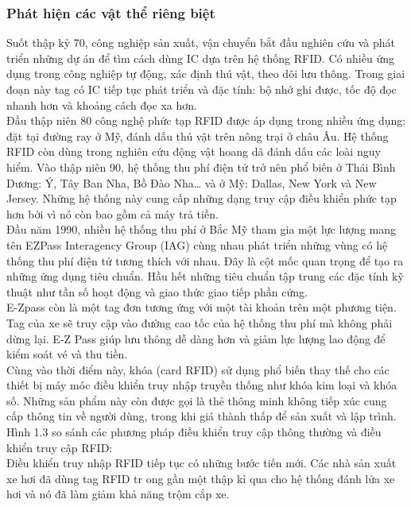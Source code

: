 \subsubsection{Phát hiện các vật thể riêng biệt}
Suốt thập kỷ 70, công nghiệp sản xuất, vận chuyển bắt đầu nghiên cứu và phát triển những dự án để tìm cách dùng IC dựa trên hệ thống RFID. Có nhiều ứng dụng trong công nghiệp tự động, xác định thú vật, theo dõi lưu thông. Trong giai đoạn này tag có IC tiếp tục phát triển và đặc tính: bộ nhớ ghi được, tốc độ đọc nhanh hơn và khoảng cách đọc xa hơn.\\
Đầu thập niên 80 công nghệ phức tạp RFID được áp dụng trong nhiều ứng dụng: đặt tại đường ray ở Mỹ, đánh dấu thú vật trên nông trại ở châu Âu. Hệ thống RFID còn dùng trong nghiên cứu động vật hoang dã đánh dấu các loài nguy hiểm. Vào thập niên 90, hệ thống thu phí điện tử trở nên phổ biến ở Thái Bình Dương: Ý, Tây Ban Nha, Bồ Đào Nha… và ở Mỹ: Dallas, New York và New Jersey. Những hệ thống này cung cấp những dạng truy cập điều khiển phức tạp hơn bởi vì nó còn bao gồm cả máy trả tiền.\\
Đầu năm 1990, nhiều hệ thống thu phí ở Bắc Mỹ tham gia một lực lượng mang tên EZPass Interagency Group (IAG) cùng nhau phát triển những vùng có hệ thống thu phí điện tử tương thích với nhau. Đây là cột mốc quan trọng để tạo ra những ứng dụng tiêu chuẩn. Hầu hết những tiêu chuẩn tập trung các đặc tính kỹ thuật như tần số hoạt động và giao thức giao tiếp phần cứng. \\
E-Zpass còn là một tag đơn tương ứng với một tài khoản trên một phương tiện. Tag của xe sẽ truy cập vào đường cao tốc của hệ thống thu phí mà không phải dừng lại. E-Z Pass giúp lưu thông dễ dàng hơn và giảm lực lượng lao động để kiểm soát vé và thu tiền.\\
Cùng vào thời điểm này, khóa (card RFID) sử dụng phổ biến thay thế cho các thiết bị máy móc điều khiển truy nhập truyền thống như khóa kim loại và khóa số. Những sản phẩm này còn được gọi là thẻ thông minh không tiếp xúc cung cấp thông tin về người dùng, trong khi giá thành thấp để sản xuất và lập trình. Hình 1.3 so sánh các phương pháp điều khiển truy cập thông thường và điều khiển truy cập RFID:
\label{ref{fig2_3}}
\\
Điều khiển truy nhập RFID tiếp tục có những bước tiến mới. Các nhà sản xuất xe hơi đã dùng tag RFID tr	ong gần một thập kỉ qua cho hệ thống đánh lửa xe hơi và nó đã làm giảm khả năng trộm cắp xe.
\label{ref{fig2_4}}

